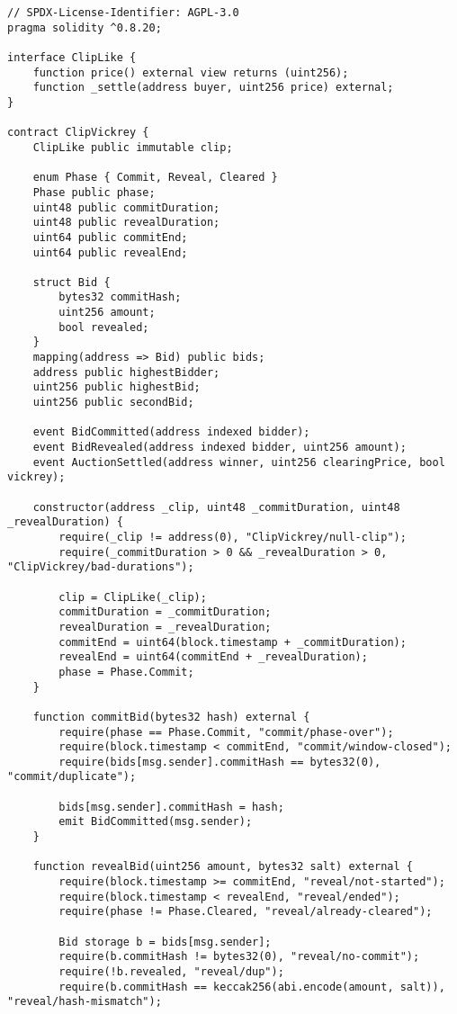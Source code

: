 \documentclass[11pt]{article}
\begin{document}
\begin{verbatim}
// SPDX-License-Identifier: AGPL-3.0
pragma solidity ^0.8.20;

interface ClipLike {
    function price() external view returns (uint256);
    function _settle(address buyer, uint256 price) external;
}

contract ClipVickrey {
    ClipLike public immutable clip;

    enum Phase { Commit, Reveal, Cleared }
    Phase public phase;
    uint48 public commitDuration;
    uint48 public revealDuration;
    uint64 public commitEnd;
    uint64 public revealEnd;

    struct Bid {
        bytes32 commitHash;
        uint256 amount;
        bool revealed;
    }
    mapping(address => Bid) public bids;
    address public highestBidder;
    uint256 public highestBid;
    uint256 public secondBid;

    event BidCommitted(address indexed bidder);
    event BidRevealed(address indexed bidder, uint256 amount);
    event AuctionSettled(address winner, uint256 clearingPrice, bool vickrey);

    constructor(address _clip, uint48 _commitDuration, uint48 _revealDuration) {
        require(_clip != address(0), "ClipVickrey/null-clip");
        require(_commitDuration > 0 && _revealDuration > 0, "ClipVickrey/bad-durations");

        clip = ClipLike(_clip);
        commitDuration = _commitDuration;
        revealDuration = _revealDuration;
        commitEnd = uint64(block.timestamp + _commitDuration);
        revealEnd = uint64(commitEnd + _revealDuration);
        phase = Phase.Commit;
    }

    function commitBid(bytes32 hash) external {
        require(phase == Phase.Commit, "commit/phase-over");
        require(block.timestamp < commitEnd, "commit/window-closed");
        require(bids[msg.sender].commitHash == bytes32(0), "commit/duplicate");

        bids[msg.sender].commitHash = hash;
        emit BidCommitted(msg.sender);
    }

    function revealBid(uint256 amount, bytes32 salt) external {
        require(block.timestamp >= commitEnd, "reveal/not-started");
        require(block.timestamp < revealEnd, "reveal/ended");
        require(phase != Phase.Cleared, "reveal/already-cleared");

        Bid storage b = bids[msg.sender];
        require(b.commitHash != bytes32(0), "reveal/no-commit");
        require(!b.revealed, "reveal/dup");
        require(b.commitHash == keccak256(abi.encode(amount, salt)), "reveal/hash-mismatch");


\end{verbatim}
\end{document}
